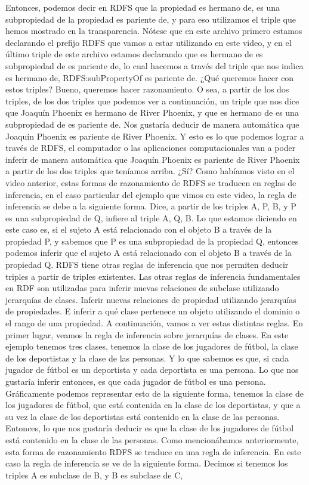 Entonces, podemos decir en RDFS que la propiedad es hermano de, es una subpropiedad de la propiedad es pariente de, y para eso utilizamos el triple que hemos mostrado en la transparencia. Nótese que en este archivo primero estamos declarando el prefijo RDFS que vamos a estar utilizando en este video, y en el último triple de este archivo estamos declarando que es hermano de es subpropiedad de es pariente de, lo cual hacemos a través del triple que nos indica es hermano de, RDFS:subPropertyOf es pariente de. ¿Qué queremos hacer con estos triples? Bueno, queremos hacer razonamiento. O sea, a partir de los dos triples, de los dos triples que podemos ver a continuación, un triple que nos dice que Joaquín Phoenix es hermano de River Phoenix, y que es hermano de es una subpropiedad de es pariente de. Nos gustaría deducir de manera automática que Joaquín Phoenix es pariente de River Phoenix. Y esto es lo que podemos lograr a través de RDFS, el computador o las aplicaciones computacionales van a poder inferir de manera automática que Joaquín Phoenix es pariente de River Phoenix a partir de los dos triples que teníamos arriba. ¿Sí? Como habíamos visto en el video anterior, estas formas de razonamiento de RDFS se traducen en reglas de inferencia, en el caso particular del ejemplo que vimos en este video, la regla de inferencia se debe a la siguiente forma. Dice, a partir de los triples A, P, B, y P es una subpropiedad de Q, infiere al triple A, Q, B. Lo que estamos diciendo en este caso es, si el sujeto A está relacionado con el objeto B a través de la propiedad P, y sabemos que P es una subpropiedad de la propiedad Q, entonces podemos inferir que el sujeto A está relacionado con el objeto B a través de la propiedad Q. RDFS tiene otras reglas de inferencia que nos permiten deducir triples a partir de triples existentes. Las otras reglas de inferencia fundamentales en RDF son utilizadas para inferir nuevas relaciones de subclase utilizando jerarquías de clases. Inferir nuevas relaciones de propiedad utilizando jerarquías de propiedades. E inferir a qué clase pertenece un objeto utilizando el dominio o el rango de una propiedad. A continuación, vamos a ver estas distintas reglas. En primer lugar, veamos la regla de inferencia sobre jerarquías de clases. En este ejemplo tenemos tres clases, tenemos la clase de los jugadores de fútbol, la clase de los deportistas y la clase de las personas. Y lo que sabemos es que, si cada jugador de fútbol es un deportista y cada deportista es una persona. Lo que nos gustaría inferir entonces, es que cada jugador de fútbol es una persona. Gráficamente podemos representar esto de la siguiente forma, tenemos la clase de los jugadores de fútbol, que está contenida en la clase de los deportistas, y que a su vez la clase de los deportistas está contenido en la clase de las personas. Entonces, lo que nos gustaría deducir es que la clase de los jugadores de fútbol está contenido en la clase de las personas. Como mencionábamos anteriormente, esta forma de razonamiento RDFS se traduce en una regla de inferencia. En este caso la regla de inferencia se ve de la siguiente forma. Decimos si tenemos los triples A es subclase de B, y B es subclase de C, 